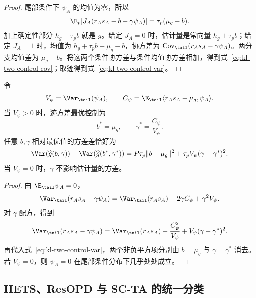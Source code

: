 \begin{proof}
尾部条件下 $\psi_A$ 的均值为零，所以
\[
 \E_p[J_A(r_As_A-b-\gamma \psi_A)]
 =\tau_p(\mu_g-b).
\]
加上确定性部分 $h_g+\tau_pb$ 就是 $g$。给定 $J_A=0$ 时，估计量是常向量 $h_g+\tau_pb$；给定 $J_A=1$ 时，均值为 $h_g+\tau_pb+\mu_g-b$，协方差为 $\operatorname{Cov}_{\tail}(r_As_A-\gamma \psi_A)$。两分支均值差为 $\mu_g-b$。将这两个条件协方差与条件均值协方差相加，得到式~\eqref{eq:kl-two-control-cov}；取迹得到式~\eqref{eq:kl-two-control-var}。
\end{proof}

\begin{theorem}[双控制的最优值与精确代价]
令
\[
 V_\psi=\Var_{\tail}(\psi_A),\qquad
 C_\psi=\E_{\tail}\langle r_As_A-\mu_g,\psi_A\rangle.
\]
当 $V_\psi>0$ 时，迹方差最优控制为
\[
 b^*=\mu_g,\qquad \gamma^*=\frac{C_\psi}{V_\psi}.
\]
任意 $b,\gamma$ 相对最优值的方差差恰好为
\begin{equation}
 \Var(\widehat g(b,\gamma))-\Var(\widehat g(b^*,\gamma^*))
 =P\tau_p\lVert b-\mu_g\rVert^2
  +\tau_pV_\psi(\gamma-\gamma^*)^2.
 \label{eq:kl-two-control-regret}
\end{equation}
当 $V_\psi=0$ 时，$\gamma$ 不影响估计量的方差。
\end{theorem}

\begin{proof}
由 $\E_{\tail}\psi_A=0$，
\[
 \Var_{\tail}(r_As_A-\gamma \psi_A)
 =\Var_{\tail}(r_As_A)-2\gamma C_\psi+\gamma^2V_\psi.
\]
对 $\gamma$ 配方，得到
\[
 \Var_{\tail}(r_As_A-\gamma \psi_A)
 =\Var_{\tail}(r_As_A)-\frac{C_\psi^2}{V_\psi}
  +V_\psi(\gamma-\gamma^*)^2.
\]
再代入式~\eqref{eq:kl-two-control-var}，两个非负平方项分别由 $b=\mu_g$ 与 $\gamma=\gamma^*$ 消去。若 $V_\psi=0$，则 $\psi_A=0$ 在尾部条件分布下几乎处处成立。
\end{proof}

\subsection{HETS、ResOPD 与 SC-TA 的统一分类}

